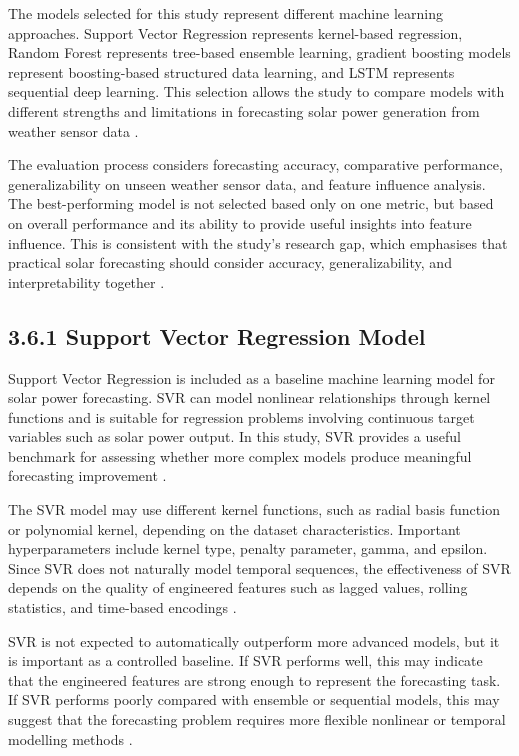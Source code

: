 The models selected for this study represent different machine learning approaches. Support Vector Regression represents kernel-based regression, Random Forest represents tree-based ensemble learning, gradient boosting models represent boosting-based structured data learning, and LSTM represents sequential deep learning. This selection allows the study to compare models with different strengths and limitations in forecasting solar power generation from weather sensor data \parencite{Bakht2025, Eren2025, TsaiLo2025}.

The evaluation process considers forecasting accuracy, comparative performance, generalizability on unseen weather sensor data, and feature influence analysis. The best-performing model is not selected based only on one metric, but based on overall performance and its ability to provide useful insights into feature influence. This is consistent with the study’s research gap, which emphasises that practical solar forecasting should consider accuracy, generalizability, and interpretability together \parencite{JnanaVarshitha2025, Duvuru2026, Ma2025}.

\subsection{3.6.1 Support Vector Regression Model}

Support Vector Regression is included as a baseline machine learning model for solar power forecasting. SVR can model nonlinear relationships through kernel functions and is suitable for regression problems involving continuous target variables such as solar power output. In this study, SVR provides a useful benchmark for assessing whether more complex models produce meaningful forecasting improvement \parencite{JnanaVarshitha2025, Alhassan2025, CarvalhoJunior2025}.

The SVR model may use different kernel functions, such as radial basis function or polynomial kernel, depending on the dataset characteristics. Important hyperparameters include kernel type, penalty parameter, gamma, and epsilon. Since SVR does not naturally model temporal sequences, the effectiveness of SVR depends on the quality of engineered features such as lagged values, rolling statistics, and time-based encodings \parencite{Eren2025, TsaiLo2025, ArellanosTafur2025}.

SVR is not expected to automatically outperform more advanced models, but it is important as a controlled baseline. If SVR performs well, this may indicate that the engineered features are strong enough to represent the forecasting task. If SVR performs poorly compared with ensemble or sequential models, this may suggest that the forecasting problem requires more flexible nonlinear or temporal modelling methods \parencite{Bakht2025, JnanaVarshitha2025, Alhassan2025}.

